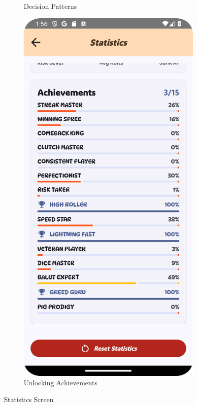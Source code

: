 \begin{figure}[ht!]
\begin{subfigure}[b]{0.27\textwidth}
        \caption{Decision Patterns}
    \end{subfigure}
    \hfill
    \begin{subfigure}[b]{0.27\textwidth}
        \includegraphics[width=\textwidth]{img/statistics screen2.png}
        \caption{Unlocking Achievements}
    \end{subfigure}
    \caption{Statistics Screen}
    \label{fig:statistics_screen}
\end{figure}

